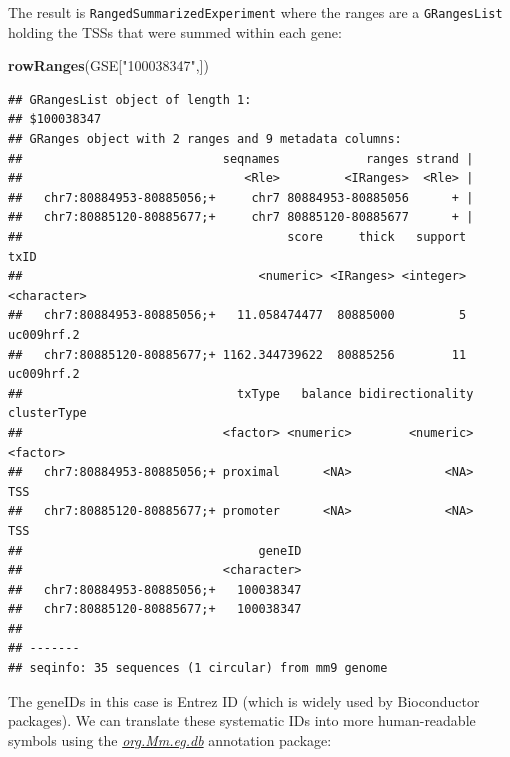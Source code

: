 \documentclass[9pt,a4paper,]{extarticle}
\newenvironment{Shaded}{\begin{snugshade}}{\end{snugshade}}
\newcommand{\KeywordTok}[1]{\textcolor[rgb]{0.13,0.29,0.53}{\textbf{{#1}}}}
\newcommand{\DataTypeTok}[1]{\textcolor[rgb]{0.13,0.29,0.53}{{#1}}}
\newcommand{\StringTok}[1]{\textcolor[rgb]{0.31,0.60,0.02}{{#1}}}
\newcommand{\CommentTok}[1]{\textcolor[rgb]{0.56,0.35,0.01}{\textit{{#1}}}}
\newcommand{\NormalTok}[1]{{#1}}
\begin{document}
The result is \texttt{RangedSummarizedExperiment} where the ranges are a \texttt{GRangesList} holding the TSSs that were summed within each gene:

\begin{Shaded}
\begin{Highlighting}[]
\KeywordTok{rowRanges}\NormalTok{(GSE[}\StringTok{"100038347"}\NormalTok{,])}
\end{Highlighting}
\end{Shaded}

\begin{verbatim}
## GRangesList object of length 1:
## $100038347 
## GRanges object with 2 ranges and 9 metadata columns:
##                            seqnames            ranges strand |
##                               <Rle>         <IRanges>  <Rle> |
##   chr7:80884953-80885056;+     chr7 80884953-80885056      + |
##   chr7:80885120-80885677;+     chr7 80885120-80885677      + |
##                                     score     thick   support        txID
##                                 <numeric> <IRanges> <integer> <character>
##   chr7:80884953-80885056;+   11.058474477  80885000         5  uc009hrf.2
##   chr7:80885120-80885677;+ 1162.344739622  80885256        11  uc009hrf.2
##                              txType   balance bidirectionality clusterType
##                            <factor> <numeric>        <numeric>    <factor>
##   chr7:80884953-80885056;+ proximal      <NA>             <NA>         TSS
##   chr7:80885120-80885677;+ promoter      <NA>             <NA>         TSS
##                                 geneID
##                            <character>
##   chr7:80884953-80885056;+   100038347
##   chr7:80885120-80885677;+   100038347
## 
## -------
## seqinfo: 35 sequences (1 circular) from mm9 genome
\end{verbatim}

The geneIDs in this case is Entrez ID (which is widely used by Bioconductor packages). We can translate these systematic IDs into more human-readable symbols using the \emph{\href{https://bioconductor.org/packages/3.8/org.Mm.eg.db}{org.Mm.eg.db}} annotation package:

\begin{Shaded}
\end{Shaded}
\end{document}
